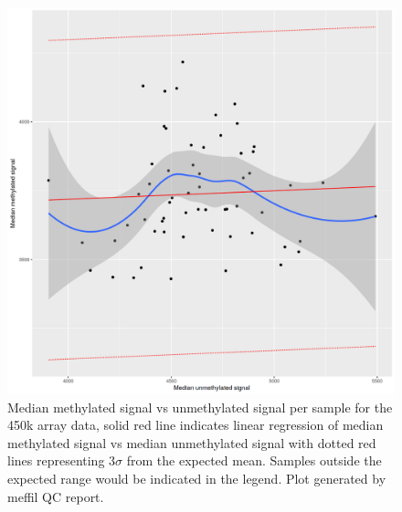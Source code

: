 \documentclass[
]{book}
\begin{document}
\begin{figure}

{\centering \includegraphics[width=0.8\linewidth]{figs/MAVIDOSqc450kmethVsUnmeth} 

}

\caption{Median methylated signal vs unmethylated signal per sample for the 450k array data, solid red line indicates linear regression of median methylated signal vs median unmethylated signal with dotted red lines representing \(3\sigma\) from the expected mean. Samples outside the expected range would be indicated in the legend. Plot generated by meffil QC report.}\label{fig:MAVIDOSqc450kmethVsUnmeth}
\end{figure}
\end{document}
